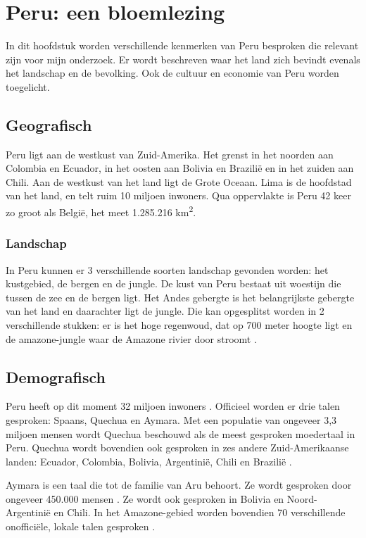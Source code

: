\section{Peru: een bloemlezing}
In dit hoofdstuk worden verschillende kenmerken van Peru besproken die relevant zijn voor mijn onderzoek. Er wordt beschreven waar het land zich bevindt evenals het landschap en de bevolking. Ook de cultuur en economie van Peru worden toegelicht.

\subsection{Geografisch}
Peru ligt aan de westkust van Zuid-Amerika. Het grenst in het noorden aan Colombia en Ecuador, in het oosten aan Bolivia en Brazilië en in het zuiden aan Chili. Aan de westkust van het land ligt de Grote Oceaan. Lima is de hoofdstad van het land, en telt ruim 10 miljoen inwoners. Qua oppervlakte is Peru 42 keer zo groot als België, het meet 1.285.216 km\textsuperscript{2}. 

\subsubsection{Landschap}
In Peru kunnen er 3 verschillende soorten landschap gevonden worden: het kustgebied, de bergen en de jungle. De kust van Peru bestaat uit woestijn die tussen de zee en de bergen ligt. Het Andes gebergte is het belangrijkste gebergte van het land en daarachter ligt de jungle. Die kan opgesplitst worden in 2 verschillende stukken: er is het hoge regenwoud, dat op 700 meter hoogte ligt en de amazone-jungle waar de Amazone rivier door stroomt \autocite{ToPeru2020}.

\subsection{Demografisch}
Peru heeft op dit moment 32 miljoen inwoners \autocite{Overheid2020}. Officieel worden er drie talen gesproken: Spaans, Quechua en Aymara. 
Met een populatie van ongeveer 3,3 miljoen mensen wordt Quechua beschouwd als de meest gesproken moedertaal in Peru. Quechua wordt bovendien ook gesproken in zes andere Zuid-Amerikaanse landen: Ecuador, Colombia, Bolivia, Argentinië, Chili en Brazilië \autocite{Cultura2020}.

Aymara is een taal die tot de familie van Aru behoort. Ze wordt gesproken door ongeveer 450.000 mensen \autocite{CulturaPeru2020}. Ze wordt ook gesproken in Bolivia en Noord-Argentinië en Chili. In het Amazone-gebied worden bovendien 70 verschillende onofficiële, lokale talen gesproken \autocite{dosmanosperu2003}.

